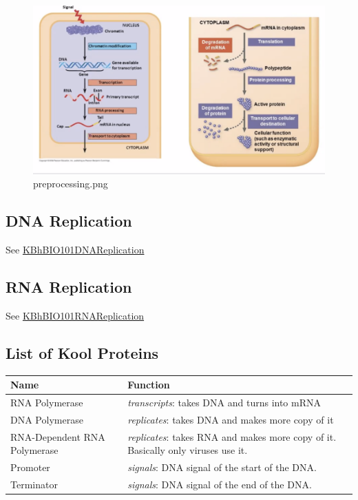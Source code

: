 \documentclass[letterpaper]{article}
\begin{document}
\begin{figure}[htbp]
\centering
\includegraphics[width=.9\linewidth]{preprocessing.png}
\caption{preprocessing.png}
\end{figure}

\subsection{DNA Replication}
\label{sec:orgf5ddb8a}
See \href{KBhBIO101DNAReplication.org}{KBhBIO101DNAReplication}

\subsection{RNA Replication}
\label{sec:orgbaab190}
See \href{KBhBIO101RNAReplication.org}{KBhBIO101RNAReplication}

\subsection{List of Kool Proteins}
\label{sec:org1cb1d14}
\begin{center}
\begin{tabular}{ll}
Name & Function\\
\hline
RNA Polymerase & \emph{transcripts}: takes DNA and turns into mRNA\\
DNA Polymerase & \emph{replicates}: takes DNA and makes more copy of it\\
RNA-Dependent RNA Polymerase & \emph{replicates}: takes RNA and makes more copy of it. Basically only viruses use it.\\
Promoter & \emph{signals}: DNA signal of the start of the DNA.\\
Terminator & \emph{signals}: DNA signal of the end of the DNA.\\
\end{tabular}
\end{center}
\end{document}
